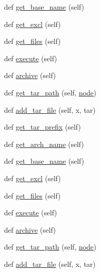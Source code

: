 \begin{DoxyCompactItemize}
\item 
def \hyperlink{classwaflib_1_1_scripting_1_1_dist_aba6bf457f948f8ac80d1de9f47a59ac2}{get\+\_\+base\+\_\+name} (self)
\item 
def \hyperlink{classwaflib_1_1_scripting_1_1_dist_a1280a2469cad7d9fa88c3afcbbfa920d}{get\+\_\+excl} (self)
\item 
def \hyperlink{classwaflib_1_1_scripting_1_1_dist_afe6d98e6e39822f250f9302b07c0afab}{get\+\_\+files} (self)
\item 
def \hyperlink{classwaflib_1_1_scripting_1_1_dist_a1ed5e146ed66af4d02c205dbb428f49f}{execute} (self)
\item 
def \hyperlink{classwaflib_1_1_scripting_1_1_dist_aaaa979f347096bd91a2feb553bbacf35}{archive} (self)
\item 
def \hyperlink{classwaflib_1_1_scripting_1_1_dist_a64707e5623688ede0aa955afe3640b98}{get\+\_\+tar\+\_\+path} (self, \hyperlink{structnode}{node})
\item 
def \hyperlink{classwaflib_1_1_scripting_1_1_dist_a2afba826ee8f5b522e6ce822f9878755}{add\+\_\+tar\+\_\+file} (self, x, tar)
\item 
def \hyperlink{classwaflib_1_1_scripting_1_1_dist_a20b28677d28b516c05e8af1b20c65c67}{get\+\_\+tar\+\_\+prefix} (self)
\item 
def \hyperlink{classwaflib_1_1_scripting_1_1_dist_a98d05f8f6a2fc8f33814fbc654135724}{get\+\_\+arch\+\_\+name} (self)
\item 
def \hyperlink{classwaflib_1_1_scripting_1_1_dist_aba6bf457f948f8ac80d1de9f47a59ac2}{get\+\_\+base\+\_\+name} (self)
\item 
def \hyperlink{classwaflib_1_1_scripting_1_1_dist_a1280a2469cad7d9fa88c3afcbbfa920d}{get\+\_\+excl} (self)
\item 
def \hyperlink{classwaflib_1_1_scripting_1_1_dist_afe6d98e6e39822f250f9302b07c0afab}{get\+\_\+files} (self)
\item 
def \hyperlink{classwaflib_1_1_scripting_1_1_dist_a1ed5e146ed66af4d02c205dbb428f49f}{execute} (self)
\item 
def \hyperlink{classwaflib_1_1_scripting_1_1_dist_aaaa979f347096bd91a2feb553bbacf35}{archive} (self)
\item 
def \hyperlink{classwaflib_1_1_scripting_1_1_dist_a64707e5623688ede0aa955afe3640b98}{get\+\_\+tar\+\_\+path} (self, \hyperlink{structnode}{node})
\item 
def \hyperlink{classwaflib_1_1_scripting_1_1_dist_a2afba826ee8f5b522e6ce822f9878755}{add\+\_\+tar\+\_\+file} (self, x, tar)
\item 

\end{DoxyCompactItemize}
